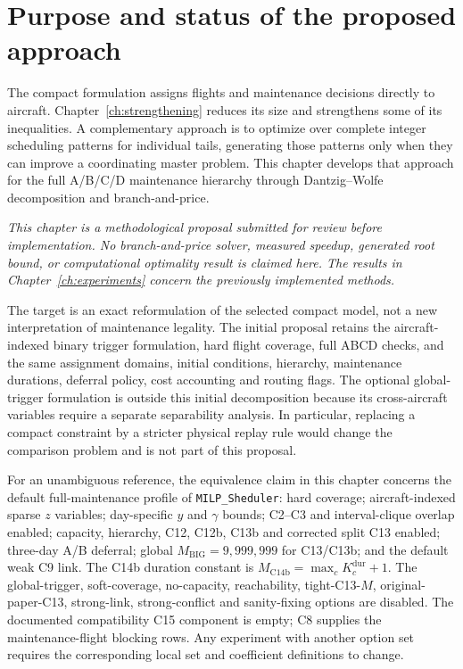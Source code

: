 \section{Purpose and status of the proposed approach}
\label{sec:bp_scope}

The compact formulation assigns flights and maintenance decisions directly to
aircraft. Chapter~\ref{ch:strengthening} reduces its size and strengthens some
of its inequalities. A complementary approach is to optimize over complete
integer scheduling patterns for individual tails, generating those patterns
only when they can improve a coordinating master problem. This chapter develops
that approach for the full A/B/C/D maintenance hierarchy through
Dantzig--Wolfe decomposition and branch-and-price.

\textit{This chapter is a methodological proposal submitted for review before
implementation. No branch-and-price solver, measured speedup, generated root
bound, or computational optimality result is claimed here. The results in
Chapter~\ref{ch:experiments} concern the previously implemented methods.}

The target is an exact reformulation of the selected compact model, not a new
interpretation of maintenance legality. The initial proposal retains the
aircraft-indexed binary trigger formulation, hard flight coverage, full ABCD
checks, and the same assignment domains, initial conditions, hierarchy,
maintenance durations, deferral policy, cost accounting and routing flags.
The optional global-trigger formulation is outside this initial decomposition
because its cross-aircraft variables require a separate separability analysis.
In particular, replacing a compact constraint by a stricter physical replay
rule would change the comparison problem and is not part of this proposal.

For an unambiguous reference, the equivalence claim in this chapter concerns
the default full-maintenance profile of \texttt{MILP\_Sheduler}: hard coverage;
aircraft-indexed sparse $z$ variables; day-specific $y$ and $\gamma$ bounds;
C2--C3 and interval-clique overlap enabled; capacity, hierarchy, C12, C12b,
C13b and corrected split C13 enabled; three-day A/B deferral; global
$M_{\mathrm{BIG}}=9{,}999{,}999$ for C13/C13b; and the default weak C9 link.
The C14b duration constant is $M_{\mathrm{C14b}}=\max_c K_c^{\mathrm{dur}}+1$.
The global-trigger, soft-coverage, no-capacity, reachability, tight-C13-$M$,
original-paper-C13, strong-link, strong-conflict and sanity-fixing options are
disabled. The documented compatibility C15 component is empty; C8 supplies
the maintenance-flight blocking rows. Any experiment with another option set
requires the corresponding local set and coefficient definitions to change.

